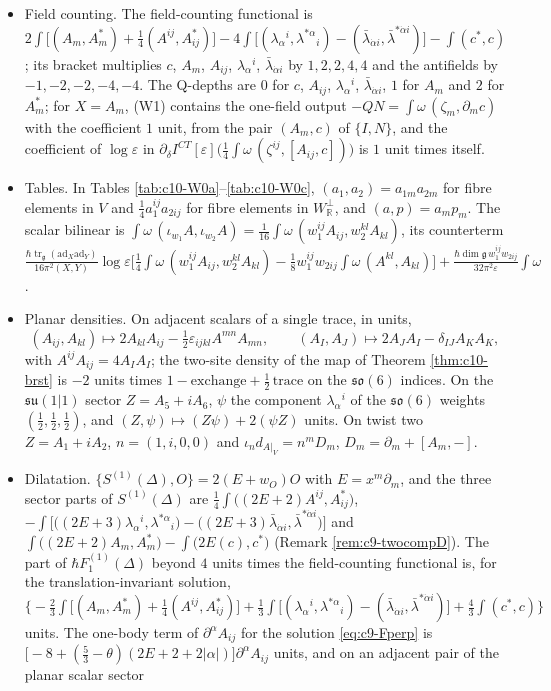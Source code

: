 \begin{remark}
\begin{itemize}
\item Field counting. The field-counting functional is $2\int\big[(A_m,A^*_m)+\tfrac14(A^{ij},A^*_{ij})\big]-4\int\big[(\lambda_\alpha{}^i,\lambda^{*\alpha}{}_i)-(\bar\lambda_{\dot\alpha i},\bar\lambda^{*\dot\alpha i})\big]-\int(c^*,c)$; its bracket multiplies $c$, $A_m$, $A_{ij}$, $\lambda_\alpha{}^i$, $\bar\lambda_{\dot\alpha i}$ by $1,2,2,4,4$ and the antifields by $-1,-2,-2,-4,-4$. The Q-depths are $0$ for $c$, $A_{ij}$, $\lambda_\alpha{}^i$, $\bar\lambda_{\dot\alpha i}$, $1$ for $A_m$ and $2$ for $A^*_m$; for $X=A_m$, (W1) contains the one-field output $-QN=\int\omega\,(\zeta_m,\partial_mc)$ with the coefficient $1$ unit, from the pair $(A_m,c)$ of $\{I,N\}$, and the coefficient of $\log\varepsilon$ in $\partial_\delta I^{CT}[\varepsilon]\big(\tfrac14\int\omega\,(\zeta^{ij},[A_{ij},c])\big)$ is $1$ unit times itself.
\item Tables. In Tables \ref{tab:c10-W0a}--\ref{tab:c10-W0c}, $(a_1,a_2)=a_{1m}a_{2m}$ for fibre elements in $V$ and $\tfrac14a_1^{ij}a_{2ij}$ for fibre elements in $W_{\mathbb R}^\perp$, and $(a,p)=a_mp_m$. The scalar bilinear is $\int\omega\,(\iota_{w_1}A,\iota_{w_2}A)=\tfrac1{16}\int\omega\,(w_1^{ij}A_{ij},w_2^{kl}A_{kl})$, its counterterm $\frac{\hbar\operatorname{tr}_{\mathfrak g}(\mathrm{ad}_X\mathrm{ad}_Y)}{16\pi^2(X,Y)}\log\varepsilon\big[\tfrac14\int\omega\,(w_1^{ij}A_{ij},w_2^{kl}A_{kl})-\tfrac18w_1^{ij}w_{2ij}\int\omega\,(A^{kl},A_{kl})\big]+\frac{\hbar\dim\mathfrak g\,w_1^{ij}w_{2ij}}{32\pi^2\varepsilon}\int\omega$.
\item Planar densities. On adjacent scalars of a single trace, in units,
\[
(A_{ij},A_{kl})\mapsto2A_{kl}A_{ij}-\tfrac12\varepsilon_{ijkl}A^{mn}A_{mn},\qquad (A_I,A_J)\mapsto2A_JA_I-\delta_{IJ}A_KA_K,
\]
with $A^{ij}A_{ij}=4A_IA_I$; the two-site density of the map of Theorem \ref{thm:c10-brst} is $-2$ units times $1-\text{exchange}+\tfrac12\,\text{trace}$ on the $\mathfrak{so}(6)$ indices. On the $\mathfrak{su}(1|1)$ sector $Z=A_5+iA_6$, $\psi$ the component $\lambda_\alpha{}^i$ of the $\mathfrak{so}(6)$ weights $(\tfrac12,\tfrac12,\tfrac12)$, and $(Z,\psi)\mapsto(Z\psi)+2(\psi Z)$ units. On twist two $Z=A_1+iA_2$, $n=(1,i,0,0)$ and $\iota_nd_{A|_V}=n^mD_m$, $D_m=\partial_m+[A_m,-]$.
\item Dilatation. $\{S^{(1)}(\Delta),O\}=2(E+w_O)O$ with $E=x^m\partial_m$, and the three sector parts of $S^{(1)}(\Delta)$ are $\tfrac14\int\big((2E+2)A^{ij},A^*_{ij}\big)$, $-\int\big[\big((2E+3)\lambda_\alpha{}^i,\lambda^{*\alpha}{}_i\big)-\big((2E+3)\bar\lambda_{\dot\alpha i},\bar\lambda^{*\dot\alpha i}\big)\big]$ and $\int\big((2E+2)A_m,A^*_m\big)-\int\big(2E(c),c^*\big)$ (Remark \ref{rem:c9-twocompD}). The part of $\hbar F_1^{(1)}(\Delta)$ beyond $4$ units times the field-counting functional is, for the translation-invariant solution, $\big\{-\tfrac23\int\big[(A_m,A^*_m)+\tfrac14(A^{ij},A^*_{ij})\big]+\tfrac13\int\big[(\lambda_\alpha{}^i,\lambda^{*\alpha}{}_i)-(\bar\lambda_{\dot\alpha i},\bar\lambda^{*\dot\alpha i})\big]+\tfrac43\int(c^*,c)\big\}$ units. The one-body term of $\partial^\alpha A_{ij}$ for the solution \eqref{eq:c9-Fperp} is $\big[-8+(\tfrac53-\theta)(2E+2+2|\alpha|)\big]\partial^\alpha A_{ij}$ units, and on an adjacent pair of the planar scalar sector

\end{itemize}
\end{remark}
